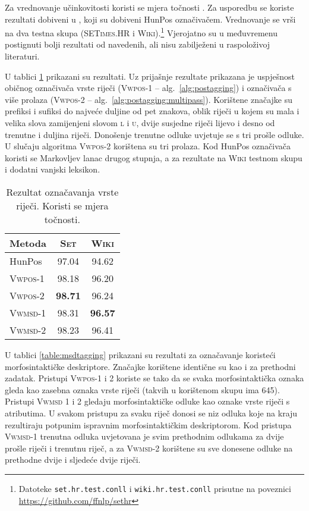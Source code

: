Za vrednovanje učinkovitosti koristi se mjera točnosti . Za
usporedbu se koriste rezultati dobiveni u \citep{agic2013lemmatization}, koji su
dobiveni HunPos označivačem. Vrednovanje se vrši na dva testna skupa
(\textsc{SETimes.HR} i \textsc{Wiki}).\footnote{Datoteke
\texttt{set.hr.test.conll} i \texttt{wiki.hr.test.conll} prisutne na poveznici
\url{https://github.com/ffnlp/sethr}} Vjerojatno su u međuvremenu postignuti
bolji rezultati od navedenih, ali nisu zabilježeni u raspoloživoj literaturi.

U tablici \ref{table:postagging} prikazani su rezultati. Uz prijašnje rezultate
prikazana je uspješnost običnog označivača vrste riječi (\textsc{Vwpos-1} --
alg.~\ref{alg:postagging}) i označivača s više prolaza (\textsc{Vwpos-2} --
alg.~\ref{alg:postagging:multipass}). Korištene značajke su prefiksi i sufiksi
do najveće duljine od pet znakova, oblik riječi u kojem su mala i velika slova
zamijenjeni slovom \textsc{l} i \textsc{u}, dvije susjedne riječi lijevo i desno
od trenutne i duljina riječi. Donošenje trenutne odluke uvjetuje se s tri prošle
odluke. U slučaju algoritma \textsc{Vwpos-2} korištena su tri prolaza. Kod HunPos
označivača koristi se Markovljev lanac drugog stupnja, a za rezultate na
\textsc{Wiki} testnom skupu i dodatni vanjski leksikon.

\begin{table}
\centering
\caption[Rezultat označavanja vrste riječi.]{Rezultat označavanja vrste riječi.
Koristi se mjera točnosti.}
\label{table:postagging}
\begin{tabular}{|l|c|c|}
\hline
Metoda                               & \textsc{Set}   & \textsc{Wiki}  \\ \hline \hline
HunPos \citep{agic2013lemmatization} & 97.04          & 94.62          \\
\textsc{Vwpos-1}                     & 98.18          & 96.20          \\
\textsc{Vwpos-2}                     & \textbf{98.71} & 96.24          \\
\textsc{Vwmsd-1}                     & 98.31          & \textbf{96.57} \\
\textsc{Vwmsd-2}                     & 98.23          & 96.41          \\ \hline
\end{tabular}
\end{table}

U tablici \ref{table:msdtagging} prikazani su rezultati za označavanje koristeći
morfosintaktičke deskriptore. Značajke korištene identične su kao i za prethodni
zadatak. Pristupi \textsc{Vwpos-1} i \textsc{2} koriste se tako da se svaka
morfosintaktička oznaka gleda kao zasebna oznaka vrste riječi (takvih u
korištenom skupu ima 645). Pristupi \textsc{Vwmsd} 1 i 2 gledaju
morfosintaktičke odluke kao oznake vrste riječi s atributima. U svakom pristupu
za svaku riječ donosi se niz odluka koje na kraju rezultiraju potpunim ispravnim
morfosintaktičkim deskriptorom.  Kod pristupa \textsc{Vwmsd-1} trenutna odluka
uvjetovana je svim prethodnim odlukama za dvije prošle riječi i trenutnu riječ,
a za \textsc{Vwmsd-2} korištene su sve donesene odluke na prethodne dvije i
sljedeće dvije riječi.


